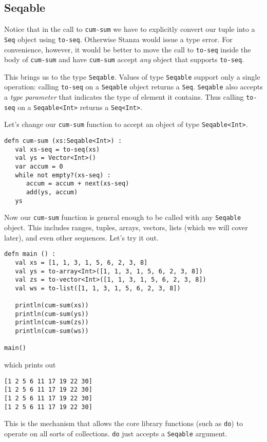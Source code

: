 \documentclass[10pt,oneside]{book}
\begin{document}
\subsection*{Seqable}
Notice that in the call to \texttt{\frenchspacing cum-sum} we have to explicitly convert our tuple into a \texttt{\frenchspacing Seq} object using \texttt{\frenchspacing to-seq}. Otherwise Stanza would issue a type error. For convenience, however, it would be better to move the call to \texttt{\frenchspacing to-seq} inside the body of \texttt{\frenchspacing cum-sum} and have \texttt{\frenchspacing cum-sum} accept {\em any} object that supports \texttt{\frenchspacing to-seq}. 

This brings us to the type \texttt{\frenchspacing Seqable}. Values of type \texttt{\frenchspacing Seqable} support only a single operation: calling \texttt{\frenchspacing to-seq} on a \texttt{\frenchspacing Seqable} object returns a \texttt{\frenchspacing Seq}. \texttt{\frenchspacing Seqable} also accepts a {\em type parameter} that indicates the type of element it contains. Thus calling \texttt{\frenchspacing to-seq} on a \texttt{\frenchspacing Seqable<Int>} returns a \texttt{\frenchspacing Seq<Int>}.

Let's change our \texttt{\frenchspacing cum-sum} function to accept an object of type \texttt{\frenchspacing Seqable<Int>}.
\begin{lstlisting}
defn cum-sum (xs:Seqable<Int>) :
   val xs-seq = to-seq(xs)
   val ys = Vector<Int>()
   var accum = 0
   while not empty?(xs-seq) :      
      accum = accum + next(xs-seq)
      add(ys, accum)
   ys
\end{lstlisting}

Now our \texttt{\frenchspacing cum-sum} function is general enough to be called with any \texttt{\frenchspacing Seqable} object. This includes ranges, tuples, arrays, vectors, lists (which we will cover later), and even other sequences. Let's try it out.
\begin{lstlisting}
defn main () :
   val xs = [1, 1, 3, 1, 5, 6, 2, 3, 8]
   val ys = to-array<Int>([1, 1, 3, 1, 5, 6, 2, 3, 8])
   val zs = to-vector<Int>([1, 1, 3, 1, 5, 6, 2, 3, 8])
   val ws = to-list([1, 1, 3, 1, 5, 6, 2, 3, 8])

   println(cum-sum(xs))
   println(cum-sum(ys))
   println(cum-sum(zs))
   println(cum-sum(ws))

main()
\end{lstlisting}
which prints out
\begin{lstlisting}
[1 2 5 6 11 17 19 22 30]
[1 2 5 6 11 17 19 22 30]
[1 2 5 6 11 17 19 22 30]
[1 2 5 6 11 17 19 22 30]
\end{lstlisting}
This is the mechanism that allows the core library functions (such as \texttt{\frenchspacing do}) to operate on all sorts of collections. \texttt{\frenchspacing do} just accepts a \texttt{\frenchspacing Seqable} argument. 
\end{document}
